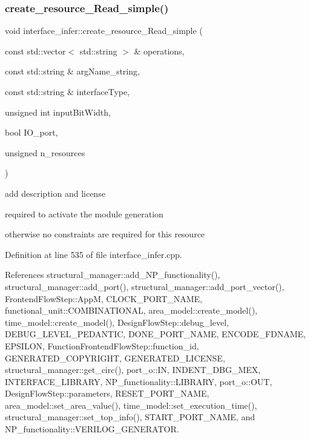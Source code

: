 \subsubsection{\texorpdfstring{create\+\_\+resource\+\_\+\+Read\+\_\+simple()}{create\_resource\_Read\_simple()}}
{\footnotesize\ttfamily void interface\+\_\+infer\+::create\+\_\+resource\+\_\+\+Read\+\_\+simple (\begin{DoxyParamCaption}\item[{const std\+::vector$<$ std\+::string $>$ \&}]{operations,  }\item[{const std\+::string \&}]{arg\+Name\+\_\+string,  }\item[{const std\+::string \&}]{interface\+Type,  }\item[{unsigned int}]{input\+Bit\+Width,  }\item[{bool}]{I\+O\+\_\+port,  }\item[{unsigned}]{n\+\_\+resources }\end{DoxyParamCaption})\hspace{0.3cm}{\ttfamily [private]}}

add description and license

required to activate the module generation

otherwise no constraints are required for this resource 

Definition at line 535 of file interface\+\_\+infer.\+cpp.



References structural\+\_\+manager\+::add\+\_\+\+N\+P\+\_\+functionality(), structural\+\_\+manager\+::add\+\_\+port(), structural\+\_\+manager\+::add\+\_\+port\+\_\+vector(), Frontend\+Flow\+Step\+::\+AppM, C\+L\+O\+C\+K\+\_\+\+P\+O\+R\+T\+\_\+\+N\+A\+ME, functional\+\_\+unit\+::\+C\+O\+M\+B\+I\+N\+A\+T\+I\+O\+N\+AL, area\+\_\+model\+::create\+\_\+model(), time\+\_\+model\+::create\+\_\+model(), Design\+Flow\+Step\+::debug\+\_\+level, D\+E\+B\+U\+G\+\_\+\+L\+E\+V\+E\+L\+\_\+\+P\+E\+D\+A\+N\+T\+IC, D\+O\+N\+E\+\_\+\+P\+O\+R\+T\+\_\+\+N\+A\+ME, E\+N\+C\+O\+D\+E\+\_\+\+F\+D\+N\+A\+ME, E\+P\+S\+I\+L\+ON, Function\+Frontend\+Flow\+Step\+::function\+\_\+id, G\+E\+N\+E\+R\+A\+T\+E\+D\+\_\+\+C\+O\+P\+Y\+R\+I\+G\+HT, G\+E\+N\+E\+R\+A\+T\+E\+D\+\_\+\+L\+I\+C\+E\+N\+SE, structural\+\_\+manager\+::get\+\_\+circ(), port\+\_\+o\+::\+IN, I\+N\+D\+E\+N\+T\+\_\+\+D\+B\+G\+\_\+\+M\+EX, I\+N\+T\+E\+R\+F\+A\+C\+E\+\_\+\+L\+I\+B\+R\+A\+RY, N\+P\+\_\+functionality\+::\+L\+I\+B\+R\+A\+RY, port\+\_\+o\+::\+O\+UT, Design\+Flow\+Step\+::parameters, R\+E\+S\+E\+T\+\_\+\+P\+O\+R\+T\+\_\+\+N\+A\+ME, area\+\_\+model\+::set\+\_\+area\+\_\+value(), time\+\_\+model\+::set\+\_\+execution\+\_\+time(), structural\+\_\+manager\+::set\+\_\+top\+\_\+info(), S\+T\+A\+R\+T\+\_\+\+P\+O\+R\+T\+\_\+\+N\+A\+ME, and N\+P\+\_\+functionality\+::\+V\+E\+R\+I\+L\+O\+G\+\_\+\+G\+E\+N\+E\+R\+A\+T\+OR.



